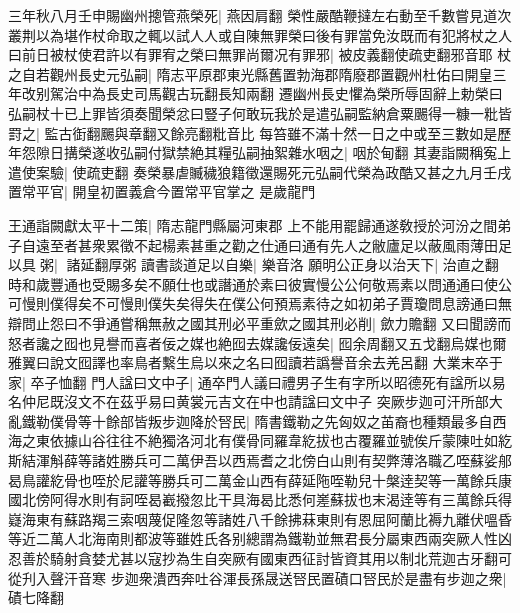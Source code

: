 三年秋八月壬申賜幽州摠管燕榮死|{
	燕因肩翻}
榮性嚴酷鞭撻左右動至千數嘗見道次叢荆以為堪作杖命取之輒以試人人或自陳無罪榮曰後有罪當免汝既而有犯將杖之人曰前日被杖使君許以有罪宥之榮曰無罪尚爾况有罪邪|{
	被皮義翻使疏吏翻邪音耶}
杖之自若觀州長史元弘嗣|{
	隋志平原郡東光縣舊置勃海郡隋廢郡置觀州杜佑曰開皇三年改别駕治中為長史司馬觀古玩翻長知兩翻}
遷幽州長史懼為榮所辱固辭上勅榮曰弘嗣杖十已上罪皆須奏聞榮忿曰豎子何敢玩我於是遣弘嗣監納倉粟颺得一糠一粃皆罸之|{
	監古衘翻颺與章翻又餘亮翻粃音比}
每笞雖不滿十然一日之中或至三數如是歷年怨隙日搆榮遂收弘嗣付獄禁絶其糧弘嗣抽絮雜水咽之|{
	咽於甸翻}
其妻詣闕稱寃上遣使案驗|{
	使疏吏翻}
奏榮暴虐贓穢狼籍徵還賜死元弘嗣代榮為政酷又甚之九月壬戌置常平官|{
	開皇初置義倉今置常平官掌之}
是歲龍門

王通詣闕獻太平十二策|{
	隋志龍門縣屬河東郡}
上不能用罷歸通遂敎授於河汾之間弟子自遠至者甚衆累徵不起楊素甚重之勸之仕通曰通有先人之敝廬足以蔽風雨薄田足以具粥|{
	諸延翻厚粥}
讀書談道足以自樂|{
	樂音洛}
願明公正身以治天下|{
	治直之翻}
時和歲豐通也受賜多矣不願仕也或譖通於素曰彼實慢公公何敬焉素以問通通曰使公可慢則僕得矣不可慢則僕失矣得失在僕公何預焉素待之如初弟子賈瓊問息謗通曰無辯問止怨曰不爭通嘗稱無赦之國其刑必平重歛之國其刑必削|{
	歛力贍翻}
又曰聞謗而怒者讒之囮也見譽而喜者佞之媒也絶囮去媒讒佞遠矣|{
	囮余周翻又五戈翻烏媒也爾雅翼曰說文囮譯也率鳥者繫生烏以來之名曰囮讀若譌譽音余去羌呂翻}
大業末卒于家|{
	卒子恤翻}
門人諡曰文中子|{
	通卒門人議曰禮男子生有字所以昭德死有諡所以易名仲尼既沒文不在茲乎易曰黄裳元吉文在中也請諡曰文中子}
突厥步迦可汗所部大亂鐵勒僕骨等十餘部皆叛步迦降於唘民|{
	隋書鐵勒之先匈奴之苖裔也種類最多自西海之東依據山谷往往不絶獨洛河北有僕骨同羅韋紇拔也古覆羅並號俟斤蒙陳吐如紇斯結渾斛薛等諸姓勝兵可二萬伊吾以西焉耆之北傍白山則有契弊薄洛職乙咥蘇娑郍曷鳥讙紇骨也咥於尼讙等勝兵可二萬金山西有薛延陁咥勒兒十槃逹契等一萬餘兵康國北傍阿得水則有訶咥曷嶻撥忽比干具海曷比悉何嵳蘇拔也末渴逹等有三萬餘兵得嶷海東有蘇路羯三索咽蔑促隆忽等諸姓八千餘拂菻東則有恩屈阿蘭比褥九離伏嗢昏等近二萬人北海南則都波等雖姓氏各别總謂為鐵勒並無君長分屬東西兩突厥人性凶忍善於騎射貪婪尤甚以寇抄為生自突厥有國東西征討皆資其用以制北荒迦古牙翻可從刋入聲汗音寒}
步迦衆潰西奔吐谷渾長孫晟送唘民置磧口唘民於是盡有步迦之衆|{
	磧七降翻}


